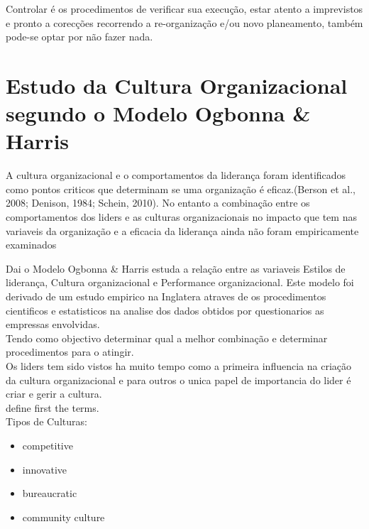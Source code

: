 Controlar é os procedimentos de verificar sua execução, estar atento a imprevistos e pronto a corecções recorrendo a re-organização e/ou novo planeamento, também pode-se optar por não fazer nada.\\




\section{Estudo da Cultura Organizacional segundo o Modelo Ogbonna \& Harris}
A cultura organizacional e o comportamentos da liderança foram identificados como pontos criticos que determinam se uma organização é eficaz.(Berson et al., 2008; Denison, 1984; Schein, 2010).
No entanto a combinação entre os comportamentos dos liders e as culturas organizacionais no impacto que tem nas variaveis da organização e a eficacia da liderança ainda não foram empiricamente examinados 

Dai o Modelo Ogbonna \& Harris estuda a relação entre as variaveis Estilos de liderança, Cultura organizacional e Performance organizacional. Este modelo foi derivado de um estudo empirico na Inglatera atraves de os procedimentos cientificos e estatisticos na analise dos dados obtidos por questionarios as empressas envolvidas.\\

Tendo como objectivo determinar qual a melhor combinação e determinar procedimentos para o atingir.\\

Os liders tem sido vistos ha muito tempo como a primeira influencia na criação da cultura organizacional e para outros o unica papel de importancia do lider é criar e gerir a cultura.\\


define first the terms.\\

Tipos de Culturas:
\begin{itemize}
\item competitive
\item innovative
\item bureaucratic
\item community culture
\end{itemize}

